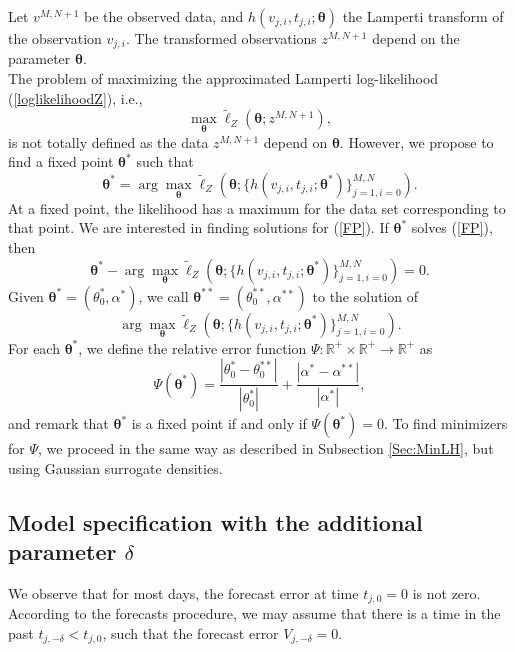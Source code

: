 \documentclass[11pt]{article}
\theoremstyle{definition}
\newcommand{\R}{\mathbb{R}}
\begin{document}
Let $v^{M,N+1}$ be the observed data, and $h( v_{j,i},t_{j,i};\bm{\theta})$ the Lamperti transform of the observation $v_{j,i}$. The transformed observations $z^{M,N+1}$ depend on the parameter $\bm{\theta}$.\\
The problem of maximizing the approximated Lamperti log-likelihood (\ref{loglikelihoodZ}), i.e.,  $$\max_{\bm{\theta}}\tilde{\ell}_Z\left(\bm{\theta}; z^{M,N+1}\right),$$
is not totally defined as the data $z^{M,N+1}$ depend on $\bm{\theta}$. However, we propose to find a fixed point $\bm{\theta}^*$ such that
\begin{equation}
\bm{\theta}^*=\arg\max_{\bm{\theta}}\tilde{\ell}_Z\left(\bm{\theta};\{h( v_{j,i},t_{j,i};\bm{\theta}^*)\}_{j=1,i=0}^{M,N}\right).
\label{FP}
\end{equation}
At a fixed point, the likelihood has a maximum for the data set corresponding to that point. We are interested in finding solutions for (\ref{FP}). If $\bm{\theta}^*$ solves (\ref{FP}), then
\begin{equation*}
\bm{\theta}^*-\arg\max_{\bm{\theta}}\tilde{\ell}_Z\left(\bm{\theta};\{h( v_{j,i},t_{j,i};\bm{\theta}^*)\}_{j=1,i=0}^{M,N}\right)=0.
\end{equation*}
Given $\bm{\theta}^*=(\theta_0^*,\alpha^*)$, we call $\bm{\theta}^{**}=(\theta_0^{**},\alpha^{**})$ to the solution of
\begin{equation*}
\arg\max_{\bm{\theta}}\tilde{\ell}_Z\left(\bm{\theta};\{h( v_{j,i},t_{j,i};\bm{\theta}^*)\}_{j=1,i=0}^{M,N}\right).
\end{equation*}
For each $\bm{\theta}^*$, we define the relative error function $\Psi:\R^+\times\R^+\to\R^+$ as
\begin{equation}
\Psi(\bm{\theta}^*)=\frac{|\theta_0^*-\theta_0^{**}|}{|\theta_0^*|}+\frac{|\alpha^*-\alpha^{**}|}{|\alpha^*|},
\label{eq:rel_error}
\end{equation}
and remark that $\bm{\theta}^*$ is a fixed point if and only if $\Psi(\bm{\theta}^*)=0$. To find minimizers for $\Psi$, we proceed in the same way as described in Subsection \ref{Sec:MinLH}, but using Gaussian surrogate densities.

\subsection{Model specification with the additional parameter $\delta$}

We observe that for most days, the forecast error at time $t_{j,0}=0$ is not zero. According to the forecasts procedure, we may assume that there is a time in the past $t_{j,-\delta}<t_{j,0}$, such that the forecast error $V_{j,-\delta}=0$.\\
\end{document}
